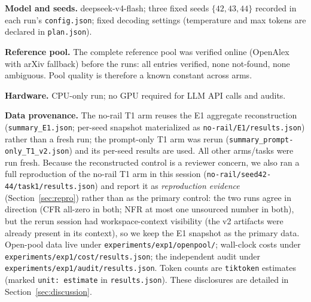 \documentclass[10pt,twocolumn]{article}
\begin{document}
\textbf{Model and seeds.} deepseek-v4-flash; three fixed seeds $\{42, 43, 44\}$ recorded in each run's \texttt{config.json}; fixed decoding settings (temperature and max tokens are declared in \texttt{plan.json}).

\textbf{Reference pool.} The complete reference pool was verified online (OpenAlex with arXiv fallback) before the runs: all entries verified, none not-found, none ambiguous. Pool quality is therefore a known constant across arms.

\textbf{Hardware.} CPU-only run; no GPU required for LLM API calls and audits.

\textbf{Data provenance.} The no-rail T1 arm reuses the E1 aggregate reconstruction (\texttt{summary\_E1.json}; per-seed snapshot materialized as \texttt{no-rail/E1/results.json}) rather than a fresh run; the prompt-only T1 arm was rerun (\texttt{summary\_prompt-only\_T1\_v2.json}) and its per-seed results are used. All other arms/tasks were run fresh. Because the reconstructed control is a reviewer concern, we also ran a full reproduction of the no-rail T1 arm in this session (\texttt{no-rail/seed42-44/task1/results.json}) and report it as \emph{reproduction evidence} (Section~\ref{sec:repro}) rather than as the primary control: the two runs agree in direction (CFR all-zero in both; NFR at most one unsourced number in both), but the rerun session had workspace-context visibility (the v2 artifacts were already present in its context), so we keep the E1 snapshot as the primary data. Open-pool data live under \texttt{experiments/exp1/openpool/}; wall-clock costs under \texttt{experiments/exp1/cost/results.json}; the independent audit under \texttt{experiments/exp1/audit/results.json}. Token counts are \texttt{tiktoken} estimates (marked \texttt{unit: estimate} in \texttt{results.json}). These disclosures are detailed in Section~\ref{sec:discussion}.
\end{document}
